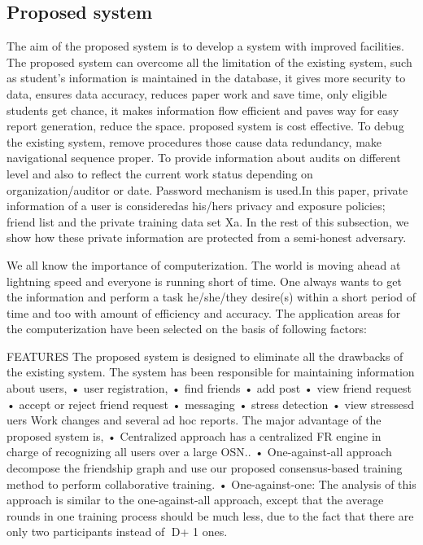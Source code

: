 \documentclass[a4paper,12pt]{article}
\begin{document}
\subsection{Proposed system}
\hspace{5mm}
The aim of the proposed system is to develop a system with improved facilities. The proposed system can overcome all the limitation of the existing system, such as student’s information is maintained in the database, it gives more security to data, ensures data accuracy, reduces paper work and save time, only eligible students get chance, it makes information flow efficient and paves way for easy report generation, reduce the space. proposed system is cost effective.
To debug the existing system, remove procedures those cause data redundancy, make navigational sequence proper. To provide information about audits on different level and also to reflect the current work status depending on organization/auditor or date. Password mechanism is used.In this paper, private information of a user is consideredas his/hers privacy and exposure policies; friend list and the private training data set Xa. In the rest of this subsection, we show how these private information are protected from a semi-honest adversary.
\vspace{5mm}\newline\par
We all know the importance of computerization. The world is moving ahead at lightning speed and everyone is running short of time. One always wants to get the information and perform a task he/she/they desire(s) within a short period of time and too with amount of efficiency and accuracy. The application areas for the computerization have been selected on the basis of following factors:

\newpage
 FEATURES 
\hspace{5mm}
           The proposed system is designed to eliminate all the drawbacks of the existing system. The system has been responsible for maintaining information about users, 
•	user registration, 
•	find friends 
•	add post
•	view friend request 
•	accept or reject friend request
•	messaging 
•	stress detection
•         view stressesd uers
Work changes and several ad hoc reports.
The major advantage of the proposed system is,
•	Centralized approach has a centralized FR engine in charge of recognizing all users over a large OSN..
•	One-against-all approach decompose the friendship graph and use our proposed consensus-based training method to perform collaborative training.
• One-against-one: The analysis of this approach is similar to the one-against-all approach, except that the average rounds in one training process should be much less, due to the fact that there are only two participants instead of D+ 1 ones.
\end{document}
